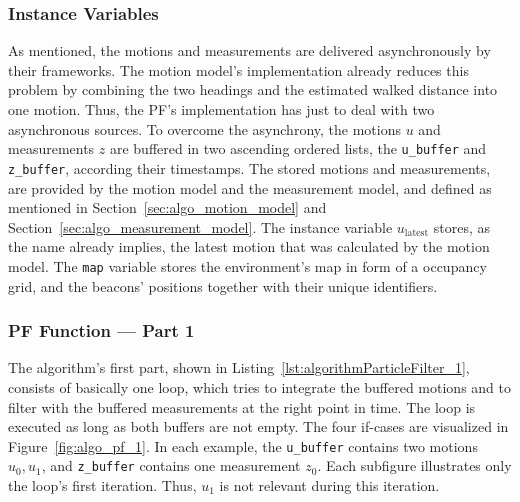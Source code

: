 \subsubsection*{Instance Variables}
As mentioned, the motions and measurements are delivered asynchronously by their frameworks. The motion model's implementation already reduces this problem by combining the two headings and the estimated walked distance into one motion. Thus, the \acs{PF}'s implementation has just to deal with two asynchronous sources. To overcome the asynchrony, the motions $u$ and measurements $z$ are buffered in two ascending ordered lists, the \texttt{u\_buffer} and \texttt{z\_buffer}, according their timestamps. The stored motions and measurements, are provided by the motion model and the measurement model, and defined as mentioned in Section~\ref{sec:algo_motion_model} and Section~\ref{sec:algo_measurement_model}. The instance variable $u_\text{latest}$ stores, as the name already implies, the latest motion that was calculated by the motion model. The \texttt{map} variable stores the environment's map in form of a occupancy grid, and the beacons' positions together with their unique identifiers.


\subsubsection*{\acl{PF} Function --- Part 1}
The algorithm's first part, shown in Listing~\ref{lst:algorithmParticleFilter_1}, consists of basically one loop, which tries to integrate the buffered motions and to filter with the buffered measurements at the right point in time. The loop is executed as long as both buffers are not empty. The four if-cases are visualized in Figure~\ref{fig:algo_pf_1}. In each example, the \texttt{u\_buffer} contains two motions $u_0, u_1$, and \texttt{z\_buffer} contains one measurement $z_0$. Each subfigure illustrates only the loop's first iteration. Thus, $u_1$ is not relevant during this iteration.

